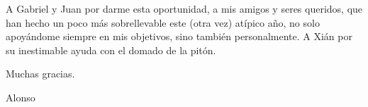 \documentclass[11pt,a4paper,titlepage,twoside,openright,openbib,spanish]{report}
\begin{document}


\paxinaenbranco
\begin{flushright}
\end{flushright}
\paxinaenbranco
\paxinaenbranco
\begin{agradecementos}
A Gabriel y Juan por darme esta oportunidad, a mis amigos y seres queridos, que han hecho un poco más sobrellevable este (otra vez) atípico año, no solo apoyándome siempre en mis objetivos, sino también personalmente. A Xián por su inestimable ayuda con el domado de la pitón.

Muchas gracias.

\begin{flushright}
Alonso
\end{flushright}
\end{agradecementos}
\pagestyle{empty}
\paxinaenbranco

\pagestyle{fancy}

\setcounter{page}{1}

\tableofcontents
\listoffigures
\listoftables
\cleardoublepage

\setcounter{page}{1}







% 
% 



% 
% 
% 




\cleardoublepage
\end{document}
